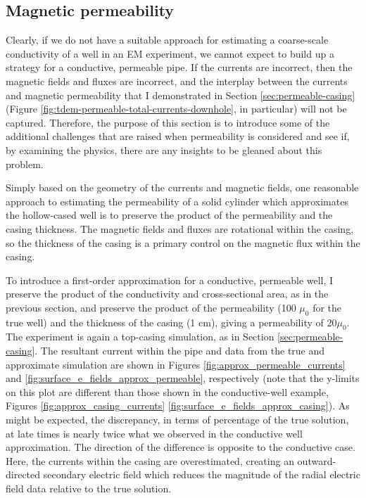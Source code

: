 \subsection{Magnetic permeability}
Clearly, if we do not have a suitable approach for estimating a coarse-scale  conductivity of a well in an EM experiment, we cannot expect to build up a strategy for a conductive, permeable pipe. If the currents are incorrect, then the magnetic fields and fluxes are incorrect, and the interplay between the currents and magnetic permeability that I demonstrated in Section \ref{sec:permeable-casing} (Figure \ref{fig:tdem-permeable-total-currents-downhole}, in particular) will not be captured. Therefore, the purpose of this section is to introduce some of the additional challenges that are raised when permeability is considered and see if, by examining the physics, there are any insights to be gleaned about this problem.

Simply based on the geometry of the currents and magnetic fields, one reasonable approach to estimating the permeability of a solid cylinder which approximates the hollow-cased well is to preserve the product of the permeability and the casing thickness. The magnetic fields and fluxes are rotational within the casing, so the thickness of the casing is a primary control on the magnetic flux within the casing.




To introduce a first-order approximation for a conductive, permeable well, I preserve the product of the conductivity and cross-sectional area, as in the previous section, and preserve the product of the permeability (100 $\mu_0$ for the true well) and the thickness of the casing (1 cm), giving a permeability of 20$\mu_0$. The experiment is again a top-casing simulation, as in Section \ref{sec:permeable-casing}. The resultant current within the pipe and data from the true and approximate simulation are shown in Figures \ref{fig:approx_permeable_currents} and \ref{fig:surface_e_fields_approx_permeable}, respectively (note that the y-limits on this plot are different than those shown in the conductive-well example, Figures \ref{fig:approx_casing_currents} \ref{fig:surface_e_fields_approx_casing}). As might be expected, the discrepancy, in terms of percentage of the true solution, at late times is nearly twice what we observed in the conductive well approximation. The direction of the difference is opposite to the conductive case. Here, the currents within the casing are overestimated, creating an outward-directed secondary electric field which reduces the magnitude of the radial electric field data relative to the true solution.



